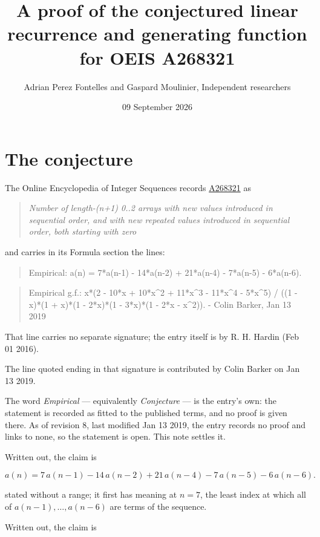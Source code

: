 \documentclass[11pt]{article}
\title{A proof of the conjectured linear recurrence and generating function for OEIS A268321}
\author{Adrian Perez Fontelles and Gaspard Moulinier, Independent researchers}
\date{09 September 2026}
\theoremstyle{definition}
\begin{document}
\maketitle
\section{The conjecture}

The Online Encyclopedia of Integer Sequences records \href{https://oeis.org/A268321}{A268321} as

\begin{quote}\itshape Number of length-(n+1) 0..2 arrays with new values introduced in sequential order, and with new repeated values introduced in sequential order, both starting with zero\end{quote}

and carries in its Formula section the lines:

\begin{quote}\ttfamily Empirical: a(n) = 7*a(n-1) - 14*a(n-2) + 21*a(n-4) - 7*a(n-5) - 6*a(n-6).\end{quote}

\begin{quote}\ttfamily Empirical g.f.: x*(2 - 10*x + 10*x\textasciicircum{}2 + 11*x\textasciicircum{}3 - 11*x\textasciicircum{}4 - 5*x\textasciicircum{}5) / ((1 - x)*(1 + x)*(1 - 2*x)*(1 - 3*x)*(1 - 2*x - x\textasciicircum{}2)). - Colin Barker, Jan 13 2019\end{quote}

That line carries no separate signature; the entry itself is by R. H. Hardin (Feb 01 2016).

The line quoted ending in that signature is contributed by Colin Barker on Jan 13 2019.

The word {\itshape Empirical} --- equivalently {\itshape Conjecture} --- is the entry's own: the statement is recorded as fitted to the published terms, and no proof is given there. As of revision 8, last modified Jan 13 2019, the entry records no proof and links to none, so the statement is open. This note settles it.

Written out, the claim is

\[a(n) = 7\,a(n-1) - 14\,a(n-2) + 21\,a(n-4) - 7\,a(n-5) - 6\,a(n-6).\]

stated without a range; it first has meaning at $n = 7$, the least index at which all of $a(n-1),\dots,a(n-6)$ are terms of the sequence.

Written out, the claim is
\end{document}
